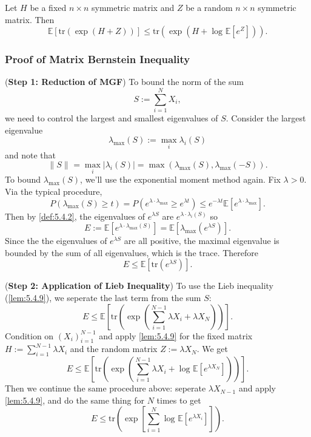 \begin{lemma}
\label{lem:5.4.9}
Let $H$ be a fixed $n \times n$ symmetric matrix and $Z$ be a random $n \times n$ symmetric matrix. Then 
\[ \mathbb{E}[\mathrm{tr}(\exp{(H + Z)})] \leq \mathrm{tr}(\exp{(H + \log_{}{\mathbb{E}[e^Z]})}). \]
\end{lemma}


\subsubsection{Proof of Matrix Bernstein Inequality}
(\textbf{Step 1: Reduction of MGF}) To bound the norm of the sum 
\[ S := \sum_{i = 1}^{N} X_i, \]
we need to control the largest and smallest eigenvalues of $S$. Consider the largest eigenvalue 
\[ \lambda_{\mathrm{max}}(S) := \max_{i} \lambda_i(S) \]
and note that 
\[ \lVert S \rVert_{} = \max_{i}|\lambda_i(S)| 
= \max_{}(\lambda_{\mathrm{max}}(S), \lambda_{\mathrm{max}}(-S)). \]
To bound $\lambda_{\mathrm{max}}(S)$, we'll use the exponential moment method again. Fix $\lambda > 0$. Via 
the typical procedure, 
\[ P(\lambda_{\mathrm{max}}(S) \geq t) 
= P(e^{\lambda \cdot \lambda_{\mathrm{max}}} \geq e^{\lambda t}) 
\leq e^{-\lambda t} \mathbb{E}[e^{\lambda \cdot \lambda_{\mathrm{max}}}]. \]
Then by \cref{def:5.4.2}, the eigenvalues of $e^{\lambda S}$ are $e^{\lambda \cdot \lambda_i(S)}$ so 
\[ E := \mathbb{E}[e^{\lambda \cdot \lambda_{\mathrm{max}}(S)}] 
= \mathbb{E}[\lambda_{\mathrm{max}}(e^{\lambda S})]. \]
Since the the eigenvalues of $e^{\lambda S}$ are all positive, the maximal eigenvalue is bounded by the sum of 
all eigenvalues, which is the trace. Therefore 
\[ E \leq \mathbb{E}[\mathrm{tr}(e^{\lambda S})]. \]

(\textbf{Step 2: Application of Lieb Inequality}) To use the Lieb inequality (\cref{lem:5.4.9}), we seperate 
the last term from the sum $S$:
\[ E \leq \mathbb{E}\left[ \mathrm{tr}\left( \exp{\left( \sum_{i = 1}^{N - 1} \lambda X_i 
+ \lambda X_N \right)} \right) \right]. \]
Condition on $(X_i)_{i = 1}^{N - 1}$ and apply \cref{lem:5.4.9} for the fixed matrix $H := \sum_{i = 1}^{N - 1} 
\lambda X_i$ and the random matrix $Z := \lambda X_N$. We get 
\[ E \leq \mathbb{E}[\mathrm{tr}(\exp{\left( \sum_{i = 1}^{N - 1} \lambda X_i 
+ \log_{}{\mathbb{E}[e^{\lambda X_N}]} \right)})]. \]
Then we continue the same procedure above: seperate $\lambda X_{N - 1}$ and apply \cref{lem:5.4.9}, and do the 
same thing for $N$ times to get 
\[ E \leq \mathrm{tr}\left( \exp{\left[ \sum_{i = 1}^{N} \log_{}{\mathbb{E}[e^{\lambda X_i}]} 
\right]} \right). \]

